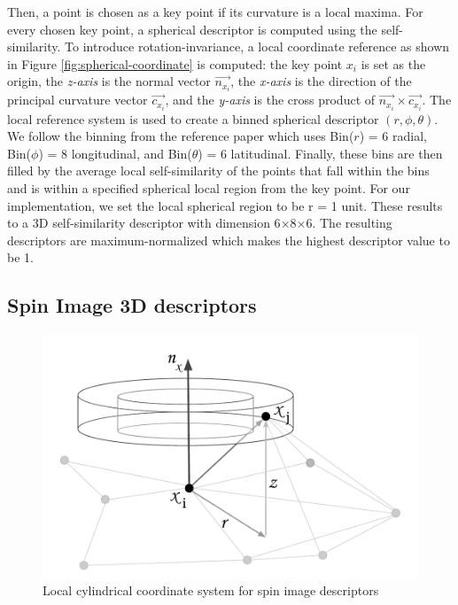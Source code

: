 \begin{appendix}
Then, a point is chosen as a key point if its curvature is a local maxima. For every chosen key point, a spherical descriptor is computed using the self-similarity. To introduce rotation-invariance, a local coordinate reference as shown in Figure \ref{fig:spherical-coordinate} is computed: the key point $x_i$ is set as the origin, the \textit{z-axis} is the normal vector $\vec{n_{x_i}}$, the \textit{x-axis} is the direction of the principal curvature vector $\vec{c_{x_i}}$, and the \textit{y-axis} is the cross product of $\vec{n_{x_i}} \times \vec{c_{x_i}}$. The local reference system is used to create a binned spherical descriptor {$(r,\phi,\theta)$}. We follow the binning from the reference paper which uses Bin($r$) = 6 radial, Bin($\phi$) = 8 longitudinal, and Bin($\theta$) = 6 latitudinal. Finally, these bins are then filled by the average local self-similarity of the points that fall within the bins and is within a specified spherical local region from the key point. For our implementation, we set the local spherical region to be r = 1 unit. These results to a 3D self-similarity descriptor with dimension 6$\times$8$\times$6. The resulting descriptors are maximum-normalized which makes the highest descriptor value to be 1.

\subsection{Spin Image 3D descriptors}\label{apdx:spin-image}

\begin{figure}[t!]
	\vspace{-2mm}
	\centering
	\includegraphics[width=0.65\columnwidth]{figures/cylindrical-coord}
	\caption{Local cylindrical coordinate system for spin image descriptors}
	\label{fig:cylindrical-coordinate}
\end{figure}


\end{appendix}
